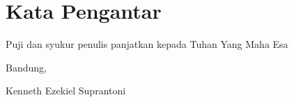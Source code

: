 \chapter*{Kata Pengantar}

Puji dan syukur penulis panjatkan kepada Tuhan Yang Maha Esa 


\begin{flushright}
	\vspace{0.5cm}
	Bandung, \tanggalpengesahan

	\vspace{1.5cm}

	Kenneth Ezekiel Suprantoni
\end{flushright}


